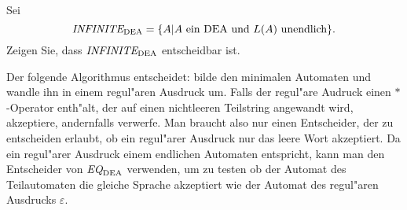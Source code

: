Sei
\[
\text{\it INFINITE}_{\text{DEA}}
=
\{
A|\text{$A$ ein DEA und $L(A)$ unendlich}
\}.
\]
Zeigen Sie, dass $\text{\it INFINITE}_{\text{DEA}}$
entscheidbar ist.

\begin{loesung}
Der folgende Algorithmus entscheidet: bilde den minimalen Automaten und
wandle ihn in einem regul"aren Ausdruck um. Falls der regul"are
Audruck einen $*$-Operator enth"alt, der auf einen nichtleeren
Teilstring angewandt wird, akzeptiere, andernfalls verwerfe.
Man braucht also nur einen Entscheider, der  zu entscheiden erlaubt,
ob ein regul"arer Ausdruck nur das leere Wort akzeptiert. Da ein
regul"arer Ausdruck einem endlichen Automaten entspricht, kann man
den Entscheider von $\text{\it EQ}_{\text{DEA}}$ verwenden, um zu
testen ob der Automat des Teilautomaten die gleiche Sprache akzeptiert
wie der Automat des regul"aren Ausdrucks $\varepsilon$.
\end{loesung}
